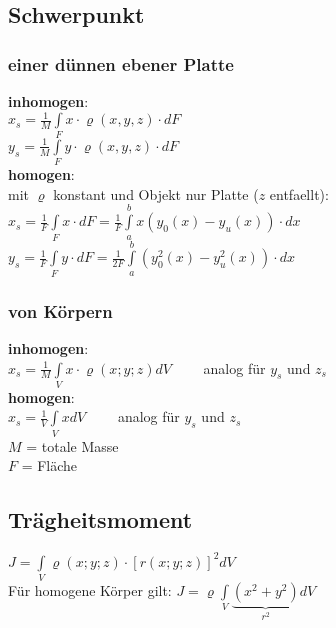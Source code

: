 \subsection{Schwerpunkt}
  \begin{multicols}{2}
    \subsubsection{einer dünnen ebener Platte}
      \textbf{inhomogen}:\\
        $x_s=\frac{1}{M} \int\limits_F x \cdot \varrho(x,y,z)\cdot dF$\\
        $y_s=\frac{1}{M} \int\limits_F y \cdot \varrho(x,y,z)\cdot dF$\\
      \textbf{homogen}:\\
        mit $\varrho$ konstant und Objekt nur Platte ($z$ entfaellt):\\
        $x_s=\frac{1}{F} \int\limits_F x\cdot dF = \frac{1}{F} \int\limits_a^b
        x(y_0(x)-y_u(x))\cdot dx$ \\
        $y_s=\frac{1}{F} \int\limits_F y\cdot dF = \frac{1}{2F} \int\limits_a^b
        (y_0^2(x)-y_u^2(x))\cdot dx$ \\
    \columnbreak
    
    \subsubsection{von Körpern}
      \textbf{inhomogen}: \\
        $x_s = \frac{1}{M}\int\limits_V x \cdot \varrho(x;y;z) dV \qquad$ analog für $y_s$ und $z_s$\\
      \textbf{homogen}: \\
        $x_s = \frac{1}{V}\int\limits_V x dV \qquad$ analog für $y_s$ und $z_s$\\
      
      $M$ = totale Masse\\
      $F$ = Fläche
  \end{multicols}
   
\subsection{Trägheitsmoment}
  $J = \int\limits_V \varrho(x;y;z) \cdot [r(x;y;z)]^2 dV$ \\
  Für homogene Körper gilt: $J = \varrho \int\limits_V \underbrace{(x^2+y^2)}_{r^2}dV$

\newpage

